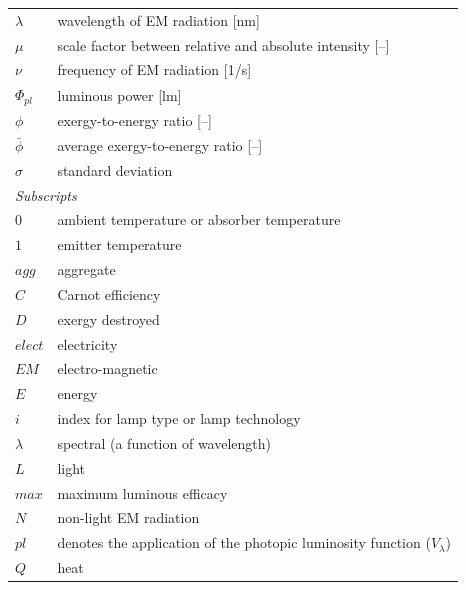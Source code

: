 \documentclass[energies,article,accept,moreauthors,pdftex]{Definitions/mdpi}\usepackage[]{graphicx}\usepackage[]{color}
\begin{document}
\begin{tabular}{ll}
  $\lambda$ & wavelength of EM radiation [nm] \\
  $\mu$ & scale factor between relative and absolute intensity [--] \\
  $\nu$ & frequency of EM radiation [1/s] \\
  $\Phi_{pl}$ & luminous power [lm] \\
  $\phi$ & exergy-to-energy ratio [--] \\
  $\bar{\phi}$ & average exergy-to-energy ratio [--] \\
  $\sigma$ & standard deviation \\
%
\multicolumn{2}{l}{\emph{Subscripts}} \\ 
%
  $0$ & ambient temperature or absorber temperature \\
  $1$ & emitter temperature \\
  $agg$ & aggregate \\
  $C$ & Carnot efficiency \\
  $D$ & exergy destroyed \\
  $elect$ & electricity \\
  $E\!M$ & electro-magnetic \\
  $E$ & energy \\
  $i$ & index for lamp type or lamp technology \\
  $\lambda$ & spectral (a function of wavelength) \\
  $L$ & light \\
  $max$ & maximum luminous efficacy \\

  $N$ & non-light EM radiation \\
  $pl$ & denotes the application of the photopic luminosity function ($V_{\lambda}$) \\
  $Q$ & heat \\
\end{tabular}
\end{document}
